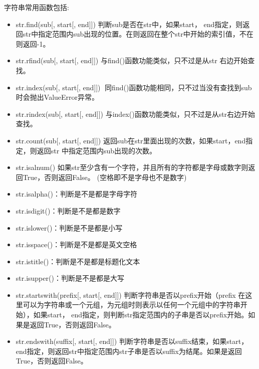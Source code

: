\documentclass[twoside,11pt]{book}
\begin{document}
字符串常用函数包括:
\begin{itemize}
  \item str.find(sub[, start[, end]]) 判断sub是否在str中，如果start， end指定，则返回str中指定范围内sub出现的位置。在则返回在整个str中开始的索引值，不在则返回-1。
  \item str.rfind(sub[, start[, end]]) 与find()函数功能类似，只不过是从str 右边开始查找。
  \item str.index(sub[, start[, end]]) 同find()函数功能相同，只不过当没有查找到sub时会抛出ValueError异常。
  \item str.rindex(sub[, start[, end]]) 与index()函数功能类似，只不过是从str右边开始查找。
  \item str.count(sub[, start[, end]])  返回sub在str里面出现的次数，如果start，end指定，则返回str 中指定范围内sub出现的次数。

  \item str.isalnum() 如果str至少含有一个字符，并且所有的字符都是字母或数字则返回True，否则返回False。 (空格即不是字母也不是数字)
  \item str.isalpha()：判断是不是都是字母字符
  \item str.isdigit()：判断是不是都是数字
  \item str.islower()：判断是不是都是小写
  \item str.isspace()：判断是不是都是英文空格
  \item str.istitle()：判断是不是都是标题化文本
  \item str.isupper()：判断是不是都是大写
  \item str.startswith(prefix[, start[, end]]) 判断字符串是否以prefix开始（prefix 在这里可以为字符串或一个元组，为元组时则表示以任何一个元组中的字符串开始），如果start， end指定，则判断str指定范围内的子串是否以prefix开始。如果是返回True，否则返回False。
  \item str.endswith(suffix[, start[, end]]) 判断字符串是否以suffix结束，如果start，end指定，则返回str中指定范围内str子串是否以suffix为结尾。如果是返回True，否则返回False。


\end{itemize}
\end{document}
